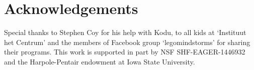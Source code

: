 \documentclass[conference]{IEEEtran}
\begin{document}
\balance

\section*{Acknowledgements}
Special thanks to Stephen Coy for his help with Kodu, to all kids at `Instituut het Centrum' and the members of Facebook group `legomindstorms' for sharing their programs. This work is supported in part by  NSF SHF-EAGER-1446932 and the Harpole-Pentair endowment at Iowa State University.




\end{document}
